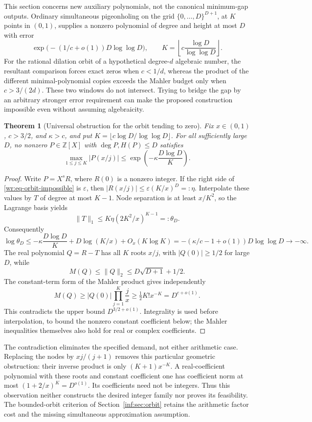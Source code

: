 \documentclass[11pt,a4paper]{article}
\newcommand{\Z}{\mathbb Z}
\newtheorem{theorem}{Theorem}[section]
\theoremstyle{definition}
\theoremstyle{remark}
\numberwithin{equation}{section}
\begin{document}
This section concerns new auxiliary polynomials, not the canonical
minimum-gap outputs. Ordinary simultaneous pigeonholing on the grid
\(\{0,\ldots,D\}^{D+1}\), at \(K\) points in \((0,1)\), supplies a
nonzero polynomial of degree and height at most \(D\) with error
\[
 \exp\bigl(-(1/c+o(1))D\log\log D\bigr),
 \qquad K=\left\lfloor c\frac{\log D}{\log\log D}\right\rfloor.
\]
For the rational dilation orbit of a hypothetical degree-\(d\) algebraic
number, the resultant comparison forces exact zeros when \(c<1/d\),
whereas the product of the different minimal-polynomial copies exceeds
the Mahler budget only when \(c>3/(2d)\). These two windows do not
intersect. Trying to bridge the gap by an arbitrary stronger error
requirement can make the proposed construction impossible even without
assuming algebraicity.

\begin{theorem}[Universal obstruction for the orbit tending to zero]
\label{wr:thm-orbit-no-go}
Fix \(x\in(0,1)\), \(c>3/2\), and \(\kappa>c\), and put
\(K=\lfloor c\log D/\log\log D\rfloor\). For all sufficiently large
\(D\), no nonzero \(P\in\Z[X]\) with \(\deg P,H(P)\le D\) satisfies
\begin{equation}\label{wr:eq-orbit-impossible}
 \max_{1\le j\le K}|P(x/j)|
 \le\exp\left(-\kappa\frac{D\log D}{K}\right).
\end{equation}
\end{theorem}
\begin{proof}
Write \(P=X^sR\), where \(R(0)\) is a nonzero integer. If the right side
of \eqref{wr:eq-orbit-impossible} is \(\varepsilon\), then
\(|R(x/j)|\le\varepsilon(K/x)^D=:\eta\). Interpolate these values by
\(T\) of degree at most \(K-1\). Node separation is at least \(x/K^2\),
so the Lagrange basis yields
\[
 \|T\|_1\le K\eta(2K^2/x)^{K-1}=:\theta_D.
\]
Consequently
\[
 \log\theta_D
 \le-\kappa\frac{D\log D}{K}+D\log(K/x)+O_x(K\log K)
 =-(\kappa/c-1+o(1))D\log\log D\to-\infty.
\]
The real polynomial \(Q=R-T\) has all \(K\) roots \(x/j\), with
\(|Q(0)|\ge1/2\) for large \(D\), while
\[
 M(Q)\le\|Q\|_2\le D\sqrt{D+1}+1/2.
\]
The constant-term form of the Mahler product gives independently
\[
 M(Q)\ge |Q(0)|\prod_{j=1}^K\frac jx
 \ge\tfrac12K!x^{-K}=D^{c+o(1)}.
\]
This contradicts the upper bound \(D^{3/2+o(1)}\). Integrality is used
before interpolation, to bound the nonzero constant coefficient below;
the Mahler inequalities themselves also hold for real or complex
coefficients.
\end{proof}

The contradiction eliminates the specified demand, not either arithmetic
case. Replacing the nodes by \(xj/(j+1)\) removes this particular
geometric obstruction: their inverse product is only
\((K+1)x^{-K}\). A real-coefficient polynomial with these roots and
constant coefficient one has coefficient norm at most
\((1+2/x)^K=D^{o(1)}\). Its coefficients need not be integers. Thus this
observation neither constructs the desired integer family nor proves
its feasibility. The bounded-orbit criterion of Section~\ref{inf:sec:orbit}
retains the arithmetic factor cost and the missing simultaneous
approximation assumption.
\end{document}
